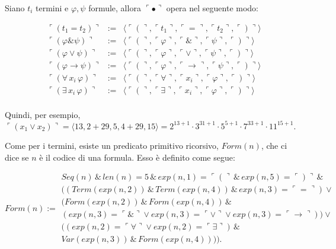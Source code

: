 Siano $t_i$ termini e $\varphi, \psi$ formule, allora $\ulcorner \bullet \urcorner$ opera nel seguente modo:

\begin{eqnarray*}
\ulcorner (t_1=t_2) \urcorner                     &:=&
\langle  \ulcorner ( \urcorner,  \ulcorner t_1 \urcorner,  \ulcorner = \urcorner,  \ulcorner t_2 \urcorner ,  \ulcorner ) \urcorner\rangle \\
\ulcorner (\varphi \& \psi) \urcorner         &:=&  \langle  \ulcorner ( \urcorner,  \ulcorner \varphi \urcorner,
\ulcorner \& \urcorner,  \ulcorner \psi \urcorner ,  \ulcorner ) \urcorner\rangle \\
\ulcorner (\varphi \vee \psi) \urcorner           &:=&  \langle  \ulcorner ( \urcorner,  \ulcorner \varphi \urcorner,
\ulcorner \vee \urcorner,  \ulcorner \psi \urcorner ,  \ulcorner ) \urcorner\rangle\\
\ulcorner (\varphi \rightarrow \psi) \urcorner  &:=&  \langle  \ulcorner ( \urcorner,  \ulcorner \varphi \urcorner,
\ulcorner \rightarrow \urcorner,  \ulcorner \psi \urcorner ,  \ulcorner ) \urcorner\rangle\\
\ulcorner (\forall\,x_i\,\varphi) \urcorner    &:=&  \langle  \ulcorner ( \urcorner,  \ulcorner \forall \urcorner,
\ulcorner x_i \urcorner,  \ulcorner \varphi \urcorner ,  \ulcorner ) \urcorner\rangle\\
\ulcorner (\exists\, x_i\, \varphi) \urcorner  &:=&  \langle  \ulcorner ( \urcorner,  \ulcorner \exists \urcorner,  \ulcorner x_i \urcorner,  \ulcorner \varphi \urcorner ,  \ulcorner ) \urcorner\rangle\\
\end{eqnarray*}

Quindi, per esempio, $\ulcorner( x_1 \vee x_2 )\urcorner = \langle 13, 2+29, 5, 4+29, 15 \rangle =
     2^{13+1}\cdot 3^{31+1} \cdot 5^{5+1}\cdot 7^{33+1} \cdot 11^{15+1}.$

Come per i termini, esiste un predicato primitivo ricorsivo, $Form(n)$, che ci dice se $n$ \`e il codice di una formula. Esso \`e definito come segue:


{\small{

\begin{displaymath}
Form(n) := \left. \begin{array}{l} Seq(n) \, \& \, len(n)= 5 \,\& \, exp(n,1) = \ulcorner ( \urcorner  \, \& \, exp(n,5)=\ulcorner ) \urcorner \,\&\,\\
((Term(exp(n,2)) \, \& \, Term(exp(n,4)) \, \& \, exp(n,3) = \ulcorner = \urcorner) \vee\\
(Form(exp(n,2)) \,\&\, Form(exp(n,4)) \,\&\\
(exp(n,3) = \ulcorner \& \urcorner \vee exp(n,3) = \ulcorner \vee \urcorner \vee exp(n,3)= \ulcorner \rightarrow \urcorner)) \vee\\
((exp(n,2) = \ulcorner \forall \urcorner \vee exp(n,2) =
\ulcorner \exists \urcorner) \,\& \\
Var(exp(n,3)) \,\&\, Form(exp(n,4)))) .
\end{array} \right.
\end{displaymath}}}

